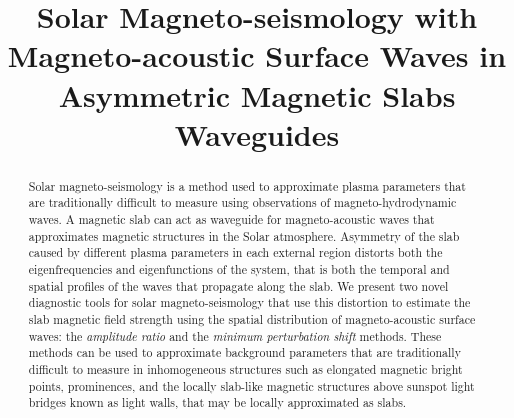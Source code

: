 \documentclass[namedreferences]{solarphysics}
\numberwithin{equation}{section}
\begin{document}
\begin{article}

\begin{opening}

\title{Solar Magneto-seismology with Magneto-acoustic Surface Waves in Asymmetric Magnetic Slabs Waveguides}

\author[addressref={UoS},email={}]{}

\author[addressref={UoS},corref,email={robertus@sheffield.ac.uk}]{}

%

\address[id={UoS}]{Solar Physics and Space Plasma Research Centre, School of Mathematics and Statistics, University of Sheffield, Hicks Building, Hounsfield Road, Sheffield, S3 7RH, UK.}


\begin{abstract}
Solar magneto-seismology is a method used to approximate plasma parameters that are traditionally difficult to measure using observations of magneto-hydrodynamic waves. A magnetic slab can act as waveguide for magneto-acoustic waves that approximates magnetic structures in the Solar atmosphere. Asymmetry of the slab caused by different plasma parameters in each external region distorts both the eigenfrequencies and eigenfunctions of the system, that is both the temporal and spatial profiles of the waves that propagate along the slab. We present two novel diagnostic tools for solar magneto-seismology that use this distortion to estimate the slab magnetic field strength using the spatial distribution of  magneto-acoustic surface waves: the \emph{amplitude ratio} and the \emph{minimum perturbation shift} methods. These methods can be used to approximate background parameters that are traditionally difficult to measure in inhomogeneous structures such as elongated magnetic bright points, prominences, and the locally slab-like magnetic structures above sunspot light bridges known as light walls, that may be locally approximated as slabs.
\end{abstract}

\end{opening}


\end{article}
\end{document}
